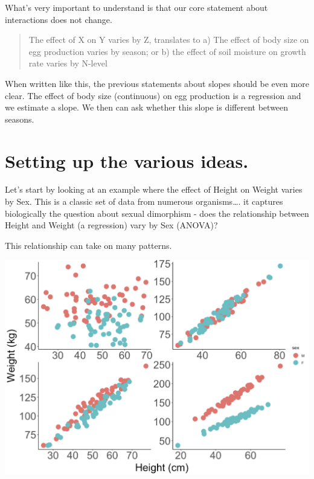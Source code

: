 \documentclass[
]{book}
\begin{document}
What's very important to understand is that our core statement about interactions does not change.

\begin{quote}
The effect of X on Y varies by Z, translates to a) The effect of body size on egg production varies by season; or b) the effect of soil moisture on growth rate varies by N-level
\end{quote}

When written like this, the previous statements about slopes should be even more clear. The effect of body size (continuous) on egg production is a regression and we estimate a slope. We then can ask whether this slope is different between seasons.

\hypertarget{setting-up-the-various-ideas.}{%
\section{Setting up the various ideas.}\label{setting-up-the-various-ideas.}}

Let's start by looking at an example where the effect of Height on Weight varies by Sex. This is a classic set of data from numerous organisms\ldots. it captures biologically the question about sexual dimorphism - does the relationship between Height and Weight (a regression) vary by Sex (ANOVA)?

This relationship can take on many patterns.

\includegraphics[width=17.89in]{images/ANCOVA_1}
\end{document}
